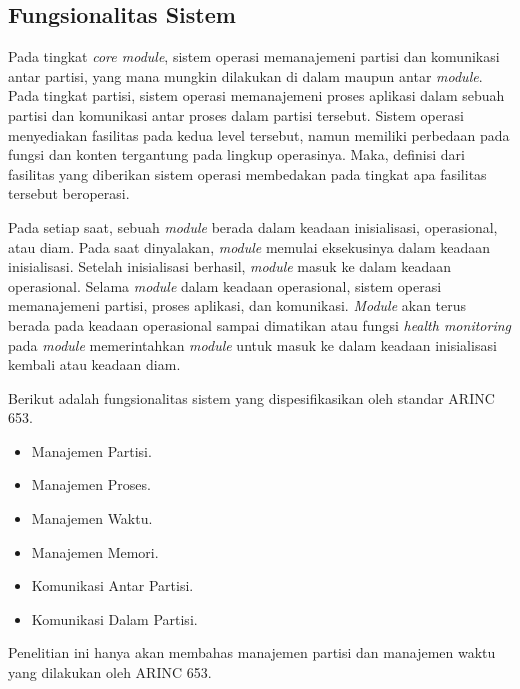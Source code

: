 \subsection{Fungsionalitas Sistem}

Pada tingkat \textit{core module}, sistem operasi memanajemeni partisi dan komunikasi antar
partisi, yang mana mungkin dilakukan di dalam maupun antar \textit{module}.  Pada tingkat
partisi, sistem operasi memanajemeni proses aplikasi dalam sebuah partisi dan komunikasi antar
proses dalam partisi tersebut.  Sistem operasi menyediakan fasilitas pada kedua level tersebut,
namun memiliki perbedaan pada fungsi dan konten tergantung pada lingkup operasinya.  Maka,
definisi dari fasilitas yang diberikan sistem operasi membedakan pada tingkat apa fasilitas
tersebut beroperasi.

Pada setiap saat, sebuah \textit{module} berada dalam keadaan inisialisasi, operasional, atau
diam.  Pada saat dinyalakan, \textit{module} memulai eksekusinya dalam keadaan inisialisasi.
Setelah inisialisasi berhasil, \textit{module} masuk ke dalam keadaan operasional.  Selama
\textit{module} dalam keadaan operasional, sistem operasi memanajemeni partisi, proses aplikasi,
dan komunikasi.  \textit{Module} akan terus berada pada keadaan operasional sampai dimatikan
atau fungsi \textit{health monitoring} pada \textit{module} memerintahkan \textit{module} untuk
masuk ke dalam keadaan inisialisasi kembali atau keadaan diam.

Berikut adalah fungsionalitas sistem yang dispesifikasikan oleh standar ARINC 653.

\begin{itemize}

    \item Manajemen Partisi.

    \item Manajemen Proses.

    \item Manajemen Waktu.

    \item Manajemen Memori.

    \item Komunikasi Antar Partisi.

    \item Komunikasi Dalam Partisi.

\end{itemize}

Penelitian ini hanya akan membahas manajemen partisi dan manajemen waktu yang dilakukan oleh
ARINC 653.

